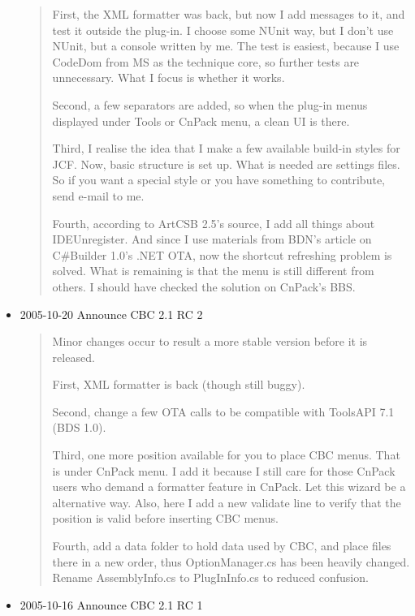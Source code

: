 \begin{itemize}
\begin{quotation}
    First, the XML formatter was back, but now I add messages to it,
    and test it outside the plug-in. I choose some NUnit way, but I
    don't use NUnit, but a console written by me. The test is easiest,
    because I use CodeDom from MS as the technique core, so further
    tests are unnecessary. What I focus is whether it works.

    Second, a few separators are added, so when the plug-in menus
    displayed under Tools or CnPack menu, a clean UI is there.

    Third, I realise the idea that I make a few available build-in styles
    for JCF. Now, basic structure is set up. What is needed are settings
    files. So if you want a special style or you have something to
    contribute, send e-mail to me.

    Fourth, according to ArtCSB 2.5's source, I add all things about
    IDEUnregister. And since I use materials from BDN's article on
    C\#Builder 1.0's .NET OTA, now the shortcut refreshing problem is
    solved. What is remaining is that the menu is still different from
    others. I should have checked the solution on CnPack's BBS.

  \end{quotation}
  \item 2005-10-20 Announce CBC 2.1 RC 2

  \begin{quotation}
    Minor changes occur to result a more stable version before it is
    released.

    First, XML formatter is back (though still buggy).

    Second, change a few OTA calls to be compatible with ToolsAPI 7.1
    (BDS 1.0).

    Third, one more position available for you to place CBC menus. That
    is under CnPack menu. I add it because I still care for those
    CnPack users who demand a formatter feature in CnPack. Let this
    wizard be a alternative way. Also, here I add a new validate line
    to verify that the position is valid before inserting CBC menus.

    Fourth, add a data folder to hold data used by CBC, and place files
    there in a new order, thus OptionManager.cs has been heavily changed.
    Rename AssemblyInfo.cs to PlugInInfo.cs to reduced confusion.

  \end{quotation}
  \item 2005-10-16 Announce CBC 2.1 RC 1


\end{itemize}
